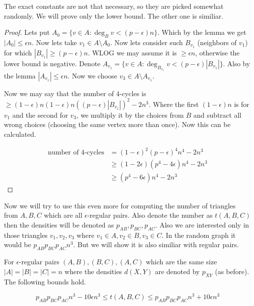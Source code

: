 The exact constants are not that necessary, so they are picked somewhat randomly. We will prove only the lower bound. The other one is similiar.

\begin{proof}
	Lets put $A_{0} = \{ v \in A : \deg_{B} v < (p - \epsilon) n\}$. Which by the lemma we get $|A_{0}| \leq \epsilon n$. Now lets take $v_1 \in A \setminus A_{0}$. Now lets consider such $B_{v_1}$ (neighbors of $v_1$) for which $|B_{v_1}| \geq (p - \epsilon) n$. WLOG we may assume it is $\ge \epsilon n$, otherwise the lower bound is negative. Denote $A_{v_1} = \{v \in A  : \deg_{B_{v_1}} v < (p - \epsilon) |B_{v_1}|\}$. Also by the lemma $|A_{v_1}| \leq \epsilon n$. Now we choose $v_3 \in A \setminus A_{v_1}$.
	
	Now we may say that the number of 4-cycles is $\geq (1-\epsilon)n (1 - \epsilon)n ((p - \epsilon) |B_{v_1}|)^2 - 2n^3$. Where the first $(1-\epsilon)n$ is for $v_1$ and the second for $v_3$, we multiply it by the choices from $B$ and subtract all wrong choices (choosing the same vertex more than once). Now this can be calculated.
	
	$$
	\begin{aligned}
		\text{number of 4-cycles} & = (1- \epsilon)^2 (p - \epsilon)^4 n^4 - 2n^3 \\
		&\geq (1-2\epsilon) (p^4 - 4\epsilon) n^4 - 2n^3 \\
		&\geq (p^4 - 6\epsilon) n^4 - 2n^3
	\end{aligned}
	$$
\end{proof}

Now we will try to use this even more for computing the number of triangles from $A,B,C$ which are all $\epsilon$-regular pairs. Also denote the number as $t(A,B,C)$ then the densities will be denoted as $p_{AB}, p_{BC}, p_{AC}$. Also we are interested only in those triangles $v_1, v_2, v_3$ where $v_1 \in A, v_2 \in B, v_3 \in C$. In the random graph it would be $p_{AB} p_{BC} p_{AC} n^3$. But we will show it is also similiar with regular pairs.

\begin{lemma}
	For $\epsilon$-regular pairs $(A,B), (B,C), (A,C)$ which are the same size $|A| = |B| = |C| = n$ where the densities $d(X,Y)$ are denoted by $p_{XY}$ (as before). The following bounds hold.
	
	$$
	p_{AB} p_{BC} p_{AC} n^3 - 10 \epsilon n^3 \leq t(A,B,C) \leq p_{AB} p_{BC} p_{AC} n^3 + 10 \epsilon n^3
	$$
\end{lemma}

